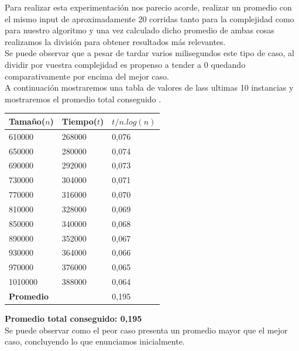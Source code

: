 Para realizar esta experimentaci\'on nos parecio acorde, realizar un promedio con el mismo input de aproximadamente 20 corridas
tanto para la complejidad como para nuestro algoritmo y una vez calculado dicho promedio de ambas cosas realizamos la divisi\'on para
obtener resultados m\'as relevantes.\\ 

Se puede observar que a pesar de tardar varios milisegundos este tipo de caso, al dividir por vuestra complejidad
es propenso a tender a 0 quedando comparativamente por encima del mejor caso.\\

A continuaci\'on mostraremos una tabla de valores de lass ultimas 10 instancias y
mostraremos el promedio total conseguido .\\


\begin{table}[H]

    \begin{tabular}{ | l | l |l |}
    \hline
Tamaño($n$) & Tiempo($t$) & \textbf{$t /n.log(n)$}  \\ \hline
610000 & 268000 & 0,076 \\ \hline
650000 & 280000 & 0,074 \\ \hline
690000 & 292000 & 0,073 \\ \hline
730000 & 304000 & 0,071 \\ \hline
770000 & 316000 & 0,070 \\ \hline
810000 & 328000 & 0,069 \\ \hline
850000 & 340000 & 0,068 \\ \hline
890000 & 352000 & 0,067 \\ \hline
930000 & 364000 & 0,066 \\ \hline
970000 & 376000 & 0,065 \\ \hline
1010000 & 388000 & 0,064 \\ \hline
    \textbf{Promedio} & & 0,195
 \\ \hline

    \end{tabular}
\end{table}

\textbf{Promedio total conseguido: 0,195}\\

Se puede observar como el peor caso presenta un promedio mayor que el mejor caso, concluyendo lo que enunciamos inicialmente.\\
